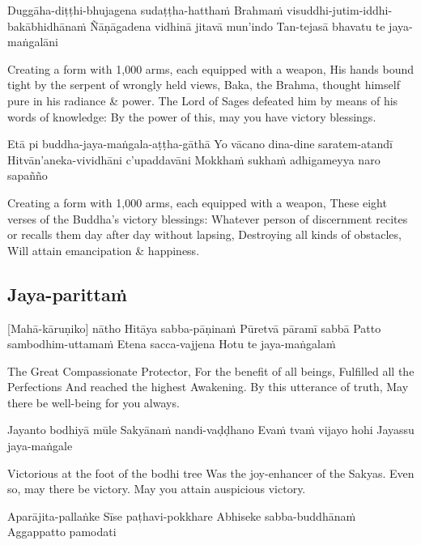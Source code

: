Duggāha-diṭṭhi-bhujagena sudaṭṭha-hatthaṁ
Brahmaṁ visuddhi-jutim-iddhi-bakābhidhānaṁ
Ñāṇāgadena vidhinā jitavā mun’indo
Tan-tejasā bhavatu te jaya-maṅgalāni

\begin{english}
  Creating a form with 1,000 arms, each equipped with a weapon,
  His hands bound tight by the serpent of wrongly held views,
  Baka, the Brahma, thought himself pure in his radiance \& power.
  The Lord of Sages defeated him by means of his words of knowledge:
  By the power of this, may you have victory blessings.
\end{english}

Etā pi buddha-jaya-maṅgala-aṭṭha-gāthā
Yo vācano dina-dine saratem-atandī
Hitvān’aneka-vividhāni c’upaddavāni
Mokkhaṁ sukhaṁ adhigameyya naro sapañño

\begin{english}
  Creating a form with 1,000 arms, each equipped with a weapon,
  These eight verses of the Buddha’s victory blessings:
  Whatever person of discernment recites or recalls them day after day without lapsing,
  Destroying all kinds of obstacles,
  Will attain emancipation \& happiness.
\end{english}

\suttaRef{[Trad]}

\subsection{Jaya-parittaṁ}
[Mahā-kāruṇiko] nātho
Hitāya sabba-pāṇinaṁ
Pūretvā pāramī sabbā
Patto sambodhim-uttamaṁ
Etena sacca-vajjena
Hotu te jaya-maṅgalaṁ

\begin{english}
  The Great Compassionate Protector,
  For the benefit of all beings,
  Fulfilled all the Perfections
  And reached the highest Awakening.
  By this utterance of truth,
  May there be well-being for you always.
\end{english}

Jayanto bodhiyā mūle
Sakyānaṁ nandi-vaḍḍhano
Evaṁ tvaṁ vijayo hohi
Jayassu jaya-maṅgale

\begin{english}
  Victorious at the foot of the bodhi tree
  Was the joy-enhancer of the Sakyas.
  Even so, may there be victory.
  May you attain auspicious victory.
\end{english}

Aparājita-pallaṅke
Sīse paṭhavi-pokkhare
Abhiseke sabba-buddhānaṁ
Aggappatto pamodati

